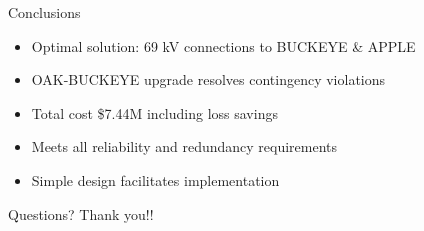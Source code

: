\documentclass{beamer}
\begin{document}
	\begin{frame}{Conclusions}
		\begin{itemize}
			\item Optimal solution: 69 kV connections to BUCKEYE \& APPLE
			\item OAK-BUCKEYE upgrade resolves contingency violations
			\item Total cost \$7.44M including loss savings
			\item Meets all reliability and redundancy requirements
			\item Simple design facilitates implementation
		\end{itemize}
	\end{frame}
	
	\begin{frame}{Questions?}
		\centering
		\Large{Thank you!!}
	\end{frame}
	
\end{document}
